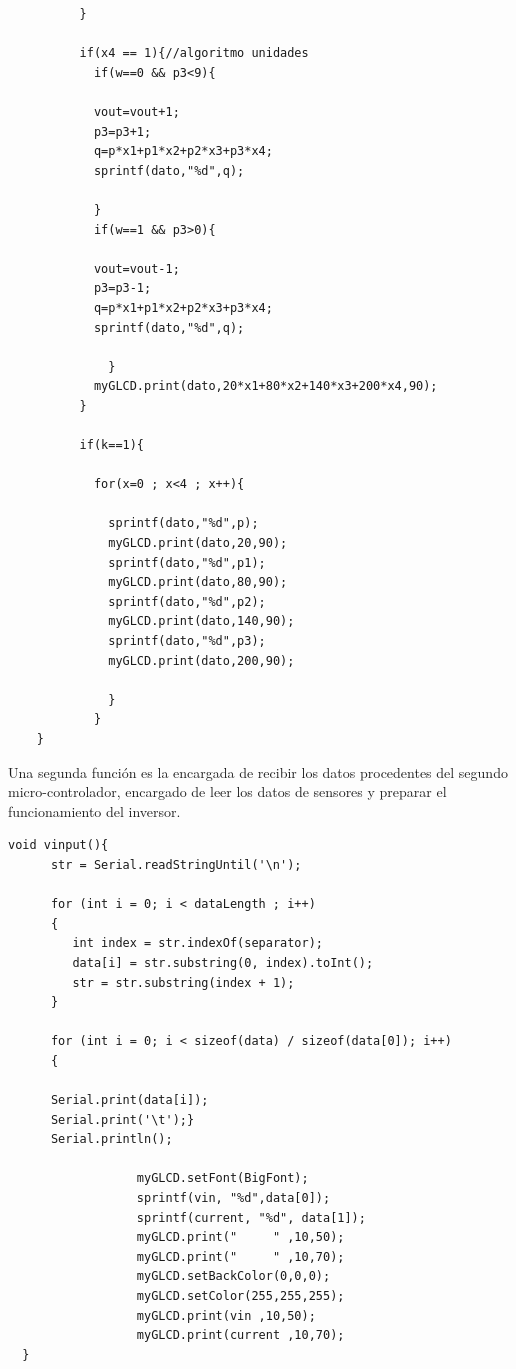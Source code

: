 \begin{verbatim}
          }
          
          if(x4 == 1){//algoritmo unidades
            if(w==0 && p3<9){
            
            vout=vout+1;
            p3=p3+1;
            q=p*x1+p1*x2+p2*x3+p3*x4;
            sprintf(dato,"%d",q);
            
            }
            if(w==1 && p3>0){
            
            vout=vout-1;
            p3=p3-1;
            q=p*x1+p1*x2+p2*x3+p3*x4;
            sprintf(dato,"%d",q);
              
              }
            myGLCD.print(dato,20*x1+80*x2+140*x3+200*x4,90);
          }
          
          if(k==1){
          
            for(x=0 ; x<4 ; x++){
            
              sprintf(dato,"%d",p);
              myGLCD.print(dato,20,90);
              sprintf(dato,"%d",p1);
              myGLCD.print(dato,80,90);
              sprintf(dato,"%d",p2);
              myGLCD.print(dato,140,90);
              sprintf(dato,"%d",p3);
              myGLCD.print(dato,200,90);
              
              }
            }
    }
\end{verbatim}

Una segunda función es la encargada de recibir los datos procedentes del segundo micro-controlador, encargado de leer los datos de sensores y preparar el funcionamiento del inversor. 

\begin{verbatim}
void vinput(){
      str = Serial.readStringUntil('\n');
      
      for (int i = 0; i < dataLength ; i++)
      {
         int index = str.indexOf(separator);
         data[i] = str.substring(0, index).toInt();
         str = str.substring(index + 1);
      }
      
      for (int i = 0; i < sizeof(data) / sizeof(data[0]); i++)    
      {
      
      Serial.print(data[i]); 
      Serial.print('\t');} 
      Serial.println();
      
                  myGLCD.setFont(BigFont);
                  sprintf(vin, "%d",data[0]);
                  sprintf(current, "%d", data[1]);
                  myGLCD.print("     " ,10,50);
                  myGLCD.print("     " ,10,70);
                  myGLCD.setBackColor(0,0,0);
                  myGLCD.setColor(255,255,255);
                  myGLCD.print(vin ,10,50);
                  myGLCD.print(current ,10,70);
  }
\end{verbatim}

